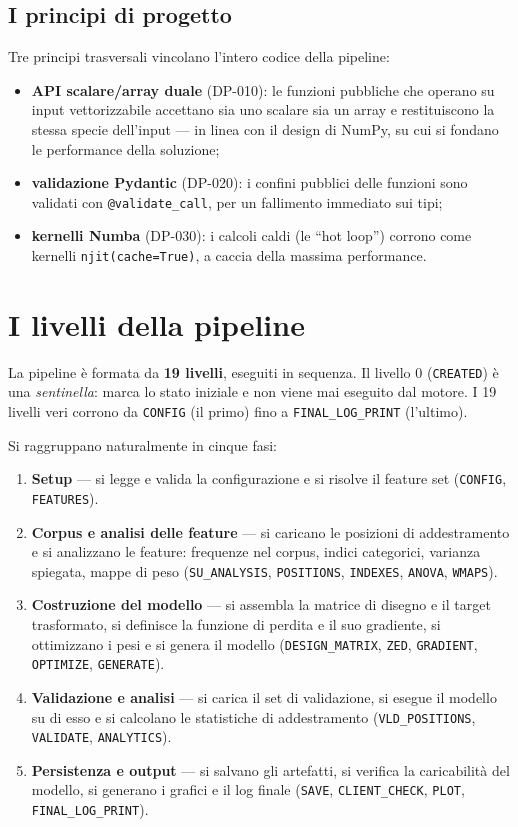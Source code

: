 \subsection{I principi di progetto}

Tre principi trasversali vincolano l'intero codice della pipeline:
\begin{itemize}
  \item \textbf{API scalare/array duale} (DP-010): le funzioni pubbliche che
    operano su input vettorizzabile accettano sia uno scalare sia un array e
    restituiscono la stessa specie dell'input — in linea con il design di NumPy,
    su cui si fondano le performance della soluzione;
  \item \textbf{validazione Pydantic} (DP-020): i confini pubblici delle funzioni
    sono validati con \texttt{@validate\_call}, per un fallimento immediato sui
    tipi;
  \item \textbf{kernelli Numba} (DP-030): i calcoli caldi (le ``hot loop'')
    corrono come kernelli \texttt{njit(cache=True)}, a caccia della massima
    performance.
\end{itemize}

\section{I livelli della pipeline}

La pipeline è formata da \textbf{19 livelli}, eseguiti in sequenza. Il livello
0 (\texttt{CREATED}) è una \emph{sentinella}: marca lo stato iniziale e non
viene mai eseguito dal motore. I 19 livelli veri corrono da \texttt{CONFIG}
(il primo) fino a \texttt{FINAL\_LOG\_PRINT} (l'ultimo).

Si raggruppano naturalmente in cinque fasi:
\begin{enumerate}
  \item \textbf{Setup} — si legge e valida la configurazione e si risolve il
    feature set (\texttt{CONFIG}, \texttt{FEATURES}).
  \item \textbf{Corpus e analisi delle feature} — si caricano le posizioni di
    addestramento e si analizzano le feature: frequenze nel corpus, indici
    categorici, varianza spiegata, mappe di peso (\texttt{SU\_ANALYSIS},
    \texttt{POSITIONS}, \texttt{INDEXES}, \texttt{ANOVA}, \texttt{WMAPS}).
  \item \textbf{Costruzione del modello} — si assembla la matrice di disegno e
    il target trasformato, si definisce la funzione di perdita e il suo
    gradiente, si ottimizzano i pesi e si genera il modello
    (\texttt{DESIGN\_MATRIX}, \texttt{ZED}, \texttt{GRADIENT},
    \texttt{OPTIMIZE}, \texttt{GENERATE}).
  \item \textbf{Validazione e analisi} — si carica il set di validazione, si
    esegue il modello su di esso e si calcolano le statistiche di addestramento
    (\texttt{VLD\_POSITIONS}, \texttt{VALIDATE}, \texttt{ANALYTICS}).
  \item \textbf{Persistenza e output} — si salvano gli artefatti, si verifica la
    caricabilità del modello, si generano i grafici e il log finale
    (\texttt{SAVE}, \texttt{CLIENT\_CHECK}, \texttt{PLOT},
    \texttt{FINAL\_LOG\_PRINT}).
\end{enumerate}

